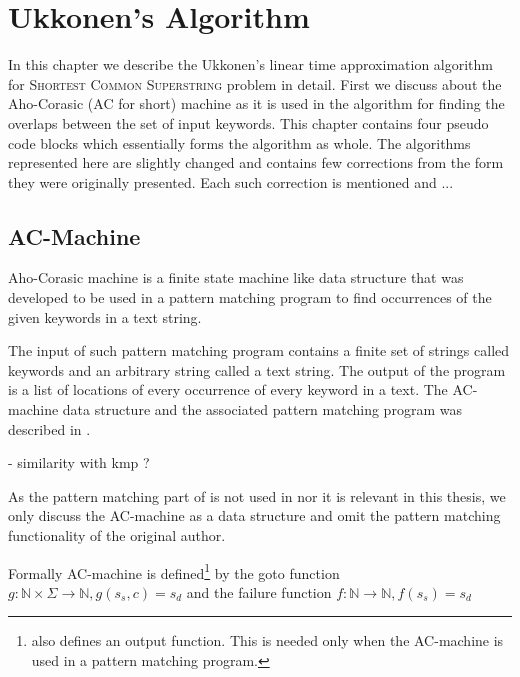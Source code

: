 \documentclass[english,twoside,censored,csm,algorithms-track-2020]{HYthesisML}
\theoremstyle{plain}
\theoremstyle{definition}
\begin{document}
\chapter{Ukkonen's Algorithm}

In this chapter we describe the Ukkonen's linear time approximation algorithm for
\textsc{Shortest Common Superstring} problem in detail. First we discuss about the
Aho-Corasic (AC for short) machine as it is used in the algorithm for finding the overlaps
between the set of input keywords. This chapter contains four pseudo code blocks which
essentially forms the algorithm as whole. The algorithms represented here are slightly changed
and contains few corrections from the form they were originally presented. Each such
correction is mentioned and ...

\listofalgorithms


\section{AC-Machine}


  
  Aho-Corasic machine is a finite state machine like data structure that was developed to be used
  in a pattern matching program to find occurrences of the given keywords in a text string. \citep{aho75}

  The input of such pattern matching program contains a finite set of strings called keywords and an
  arbitrary string called a text string. The output of the program is a list of locations of every
  occurrence of every keyword in a text. The AC-machine data structure and the associated pattern
  matching program was described in \citep{aho75}.

  - similarity with kmp ?

  As the pattern matching part of \citep{aho75} is not used in \citep{ukkonen90} nor it is relevant in
  this thesis, we only discuss the AC-machine as a data structure and omit the pattern matching
  functionality of the original author.


  Formally AC-machine is defined\footnote{\citep{aho75} also defines an output function.
  This is needed only when the AC-machine is used in a pattern matching program.} by the goto function
  $g : \mathbb{N} \times \Sigma \rightarrow \mathbb{N}, g(s_s,c) = s_d$ and the failure function
  $f : \mathbb{N} \rightarrow \mathbb{N}, f(s_s) = s_d$
\end{document}
